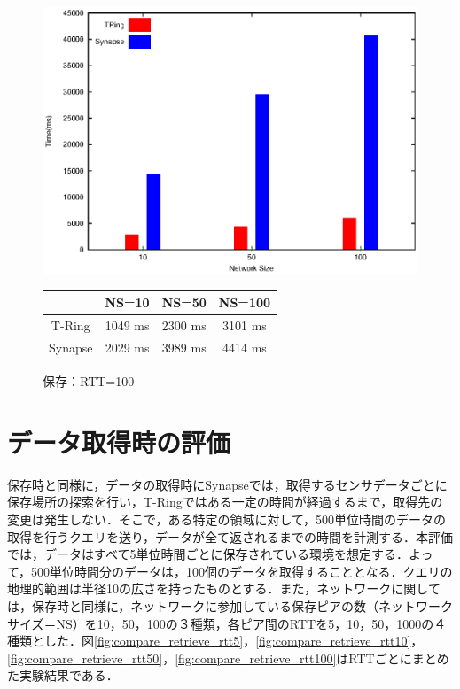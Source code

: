 \begin{figure}[htbp]
\begin{minipage}{1\textwidth}
    \centering
\includegraphics[width=14cm]{./images/compare_store_rtt100.eps}
\begin{center}
  \begin{tabular}{|c||c|c|c|} \hline
    \backslashbox{}{} & NS=10 & NS=50 & NS=100  \\ \hline \hline
       T-Ring & 1049 ms & 2300 ms & 3101 ms  \\ \hline
       Synapse & 2029  ms & 3989 ms & 4414 ms \\ \hline  \end{tabular}
  \label{tab:RTT=100}
\end{center}
\caption{保存：RTT=100}
\label{fig:compare_store_rtt100}
 \end{minipage}
\end{figure}




\section{データ取得時の評価}
保存時と同様に，データの取得時にSynapseでは，取得するセンサデータごとに保存場所の探索を行い，T-Ringではある一定の時間が経過するまで，取得先の変更は発生しない．そこで，ある特定の領域に対して，500単位時間のデータの取得を行うクエリを送り，データが全て返されるまでの時間を計測する．本評価では，データはすべて5単位時間ごとに保存されている環境を想定する．よって，500単位時間分のデータは，100個のデータを取得することとなる．クエリの地理的範囲は半径10の広さを持ったものとする．また，ネットワークに関しては，保存時と同様に，ネットワークに参加している保存ピアの数（ネットワークサイズ＝NS）を10，50，100の３種類，各ピア間のRTTを5，10，50，1000の４種類とした．図\ref{fig:compare_retrieve_rtt5}，\ref{fig:compare_retrieve_rtt10}，\ref{fig:compare_retrieve_rtt50}，\ref{fig:compare_retrieve_rtt100}はRTTごとにまとめた実験結果である．

